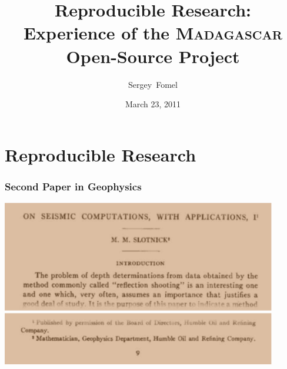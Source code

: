 \bfseries

\title[SIAM Geosciences 2011]{Reproducible Research: \\ Experience of the \textsc{Madagascar} \\ Open-Source Project}

\author[S. Fomel]{Sergey~Fomel}


\date{March 23, 2011}


\newcommand{\quotebox}[3]{
  \begin{beamercolorbox}[wd=\textwidth,center]{quotecol}
    \begin{quote}
      #1 
      \color{blue}{\emph{#2}, #3}
    \end{quote}
    \end{beamercolorbox}
}

\begin{frame}
  \MadLogo
  \titlepage
\end{frame}

\section{Reproducible Research}

\begin{frame}
\frametitle{Second Paper in Geophysics}
\begin{center}
\vfill
\includegraphics[width=0.9\textwidth]{Fig/slotnick1}
\vfill
\includegraphics[width=0.9\textwidth]{Fig/slotnick2}
\vfill
\end{center}
\end{frame}

